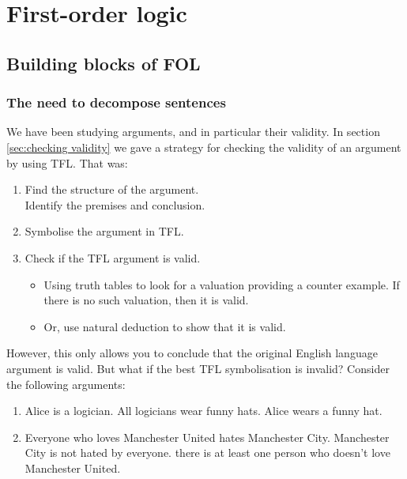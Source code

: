 \part{First-order logic}
\label{ch.FOL}
\chapter{Building blocks of FOL}\label{s:FOLBuildingBlocks}
\section{The need to decompose sentences}
We have been studying arguments, and in particular their validity. In section \ref{sec:checking validity} we gave a strategy for checking the validity of an argument by using TFL. That was:
\begin{highlighted}\begin{enumerate}
\item Find the structure of the argument. \\Identify the premises and conclusion.
\item \label{itm:validity-symbolise}Symbolise the argument in TFL.
\item \label{itm:validity-TTs} Check if the TFL argument is valid.\begin{itemize}\item Using truth tables to look for a valuation providing a counter example. If there is no such valuation, then it is valid.
\item Or, use natural deduction to show that it is valid.
\end{itemize}
\end{enumerate}
\end{highlighted}

However, this only allows you to conclude that the original English language argument is valid. But what if the best TFL symbolisation is invalid? Consider the following arguments:
\begin{enumerate}
\item \begin{earg}
\label{willard1}
\prem Alice is a logician.
\prem All logicians wear funny hats.
\conc Alice wears a funny hat.
\end{earg}
\item \begin{earg}
\prem Everyone who loves Manchester United hates Manchester City.
\prem Manchester City is not hated by everyone.
\conc there is at least one person who doesn't love Manchester United.
\end{earg}
\end{enumerate}

